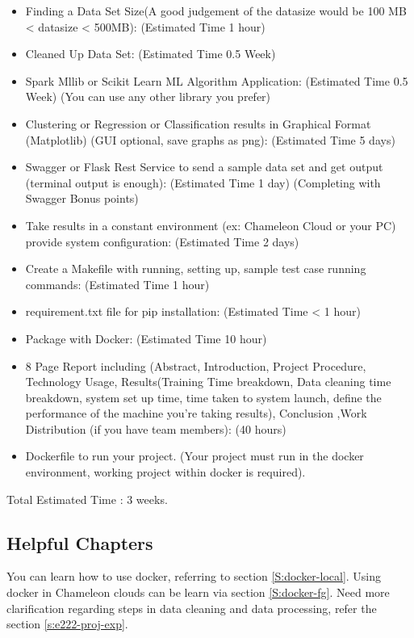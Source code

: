 \begin{itemize}
\item Finding a Data Set Size(A good judgement of the datasize would
  be 100 MB < datasize < 500MB): (Estimated Time 1 hour)
\item Cleaned Up Data Set: (Estimated Time 0.5 Week)
\item Spark Mllib or Scikit Learn ML Algorithm Application: (Estimated
  Time 0.5 Week) (You can use any other library you prefer)
\item Clustering or Regression or Classification results in Graphical
  Format (Matplotlib) (GUI optional, save graphs as png): (Estimated
  Time 5 days)
\item Swagger or Flask  Rest Service  to send  a sample data  set and  get output
  (terminal output is enough): (Estimated Time 1 day) (Completing with Swagger Bonus points)
\item Take results in a constant environment (ex: Chameleon Cloud or
  your PC) provide system configuration: (Estimated Time 2 days)
\item Create a Makefile with running, setting up, sample test case
  running commands: (Estimated Time 1 hour)
\item requirement.txt file for pip installation: (Estimated Time < 1 hour)
\item Package with Docker: (Estimated Time 10 hour)
\item 8 Page Report including (Abstract, Introduction, Project
  Procedure, Technology Usage, Results(Training Time breakdown, Data
  cleaning time breakdown, system set up time, time taken to system
  launch, define the performance of the machine you're taking
  results), Conclusion ,Work Distribution (if you have team members): (40 hours)
\item Dockerfile to run your project. (Your project must run in the
  docker environment, working project within docker is required).
\end{itemize}

Total Estimated Time : 3 weeks.

\subsection{Helpful Chapters}

You can learn how to use docker, referring to section
\ref{S:docker-local}.  Using docker in Chameleon clouds can be learn
via section \ref{S:docker-fg}.  Need more clarification regarding
steps in data cleaning and data processing, refer the section
\ref{s:e222-proj-exp}.


